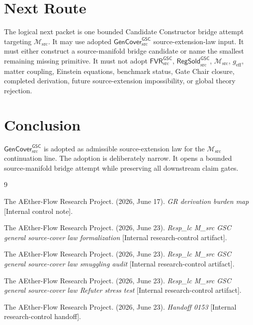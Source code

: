 \documentclass[11pt]{article}
\newcommand{\Msrc}{\mathcal{M}_{\mathrm{src}}}
\newcommand{\geff}{g_{\mathrm{eff}}}
\newcommand{\GenCover}{\mathsf{GenCover}_{\mathrm{src}}^{\mathsf{GSC}}}
\newcommand{\FVR}{\mathsf{FVR}_{\mathrm{src}}^{\mathsf{GSC}}}
\newcommand{\RegSold}{\mathsf{RegSold}_{\mathrm{src}}^{\mathsf{GSC}}}
\begin{document}
\section{Next Route}

The logical next packet is one bounded Candidate Constructor bridge attempt
targeting \(\Msrc\). It may use adopted \(\GenCover\) source-extension-law
input. It must either construct a source-manifold bridge candidate or name the
smallest remaining missing primitive. It must not adopt \(\FVR\),
\(\RegSold\), \(\Msrc\), \(\geff\), matter coupling, Einstein equations,
benchmark status, Gate Chair closure, completed derivation, future
source-extension impossibility, or global theory rejection.

\section{Conclusion}

\(\GenCover\) is adopted as admissible source-extension law for the
\(\Msrc\) continuation line. The adoption is deliberately narrow. It opens a
bounded source-manifold bridge attempt while preserving all downstream claim
gates.

\begin{thebibliography}{9}

The AEther-Flow Research Project. (2026, June 17). \emph{GR derivation burden
map} [Internal control note].

The AEther-Flow Research Project. (2026, June 23). \emph{Resp\_lc M\_src GSC
general source-cover law formalization} [Internal research-control artifact].

The AEther-Flow Research Project. (2026, June 23). \emph{Resp\_lc M\_src GSC
general source-cover law smuggling audit} [Internal research-control
artifact].

The AEther-Flow Research Project. (2026, June 23). \emph{Resp\_lc M\_src GSC
general source-cover law Refuter stress test} [Internal research-control
artifact].

The AEther-Flow Research Project. (2026, June 23). \emph{Handoff 0153}
[Internal research-control handoff].

\end{thebibliography}
\end{document}
